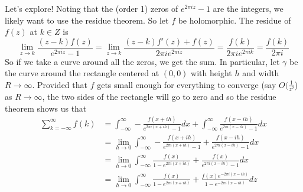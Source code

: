\documentclass{homework}
\begin{document}
                                                                                \begin{solution}
                                                                                Let's explore! Noting that the (order 1) zeros of $e^{2\pi i z} - 1$ are the integers, we likely want to use the residue theorem. So let $f$ be holomorphic. The residue of $f(z)$ at $k\in Z$ is
                                                                                \[
                                                                                \lim_{z\to k} \frac{(z-k)f(z)}{e^{2\pi i z}-1} = \lim_{z\to k}\frac{(z-k)f'(z)+f(z)}{2\pi i e^{2\pi iz}} = \frac{f(k)}{2\pi i e^{2\pi ik}} = \frac{f(k)}{2\pi i}
                                                                                \]
                                                                                So if we take a curve around all the zeros, we get the sum. In particular, let $\gamma$ be the curve around the rectangle centered at $(0,0)$ with height $h$ and width $R\to \infty$. Provided that $f$ gets small enough for everything to converge (say $O(\frac{1}{z^2}$) as $R\to \infty$, the two sides of the rectangle will go to zero and so the residue theorem shows us that 
                                                                                \begin{align*}
                                                                                \sum_{k=-\infty}^\infty f(k) &= \int_{-\infty}^\infty -\frac{f(x+ih)}{e^{2\pi i (x+ih)}-1} dx + \int_{-\infty}^\infty \frac{f(x-ih)}{e^{2\pi i (x-ih)}-1} dx\\
                                                                                &= \lim_{h\to 0}\int_{-\infty}^\infty -\frac{f(x+ih)}{e^{2\pi i (x+ih)}-1} + \frac{f(x-ih)}{e^{2\pi i (x-ih)}-1} dx\\
                                                                                &= \lim_{h\to 0}\int_{-\infty}^\infty \frac{f(x)}{1 - e^{2\pi i (x+ih)}} + \frac{f(x)}{e^{2\pi i (x - ih)}-1} dx\\
                                                                                &= \lim_{h\to 0}\int_{-\infty}^\infty \frac{f(x)}{1 - e^{2\pi i (x+ih)}} + \frac{f(x)e^{-2\pi i (x - ih)}}{1 - e^{-2\pi i(x-ih)}} dz
                                                                                \end{align*}


\end{solution}
\end{document}
